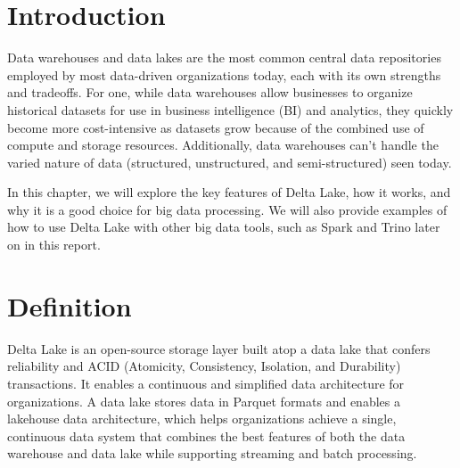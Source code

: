 \section*{Introduction}

Data warehouses and data lakes are the most common central data repositories employed by most data-driven organizations today, each with its own strengths and tradeoffs. For one, while data warehouses allow businesses to organize historical datasets for use in business intelligence (BI) and analytics, they quickly become more cost-intensive as datasets grow because of the combined use of compute and storage resources. Additionally, data warehouses can’t handle the varied nature of data (structured, unstructured, and semi-structured) seen today.

In this chapter, we will explore the key features of Delta Lake, how it works, and why it is a good choice for big data processing. We will also provide examples of how to use Delta Lake with other big data tools, such as Spark and Trino later on in this report.
\section{Definition}
Delta Lake is an open-source storage layer built atop a data lake that confers reliability and ACID (Atomicity, Consistency, Isolation, and Durability) transactions. It enables a continuous and simplified data architecture for organizations. A data lake stores data in Parquet formats and enables a lakehouse data architecture, which helps organizations achieve a single, continuous data system that combines the best features of both the data warehouse and data lake while supporting streaming and batch processing.

